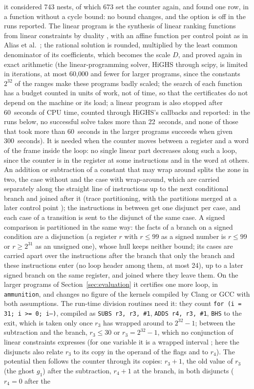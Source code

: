 \documentclass[oneside,english]{amsart}
\numberwithin{equation}{section}
\theoremstyle{plain}
\theoremstyle{definition}
\theoremstyle{plain}
\theoremstyle{plain}
\theoremstyle{remark}
\begin{document}
it considered 743 nests, of which 673 set the counter again, and found one row, in a function without a cycle bound: no bound changes, and the option is off in the runs reported. The linear program is the synthesis of linear ranking functions from linear constraints by duality \cite{colon2001synthesis}, with an affine function per control point as in Alias et al.\ \cite{alias2010multi}; the rational solution is rounded, multiplied by the least common denominator of its coefficients, which becomes the scale $D$, and proved again in exact arithmetic (the linear-programming solver, HiGHS through scipy, is limited in iterations, at most 60{,}000 and fewer for larger programs, since the constants $2^{32}$ of the ranges make these programs badly scaled; the search of each function has a budget counted in units of work, not of time, so that the certificates do not depend on the machine or its load; a linear program is also stopped after 60~seconds of CPU time, counted through HiGHS's callbacks and reported: in the runs below, no successful solve takes more than 22~seconds, and none of those that took more than 60~seconds in the larger programs succeeds when given 300~seconds). It is needed when the counter moves between a register and a word of the frame inside the loop: no single linear part decreases along such a loop, since the counter is in the register at some instructions and in the word at others. An addition or subtraction of a constant that may wrap around splits the zone in two, the case without and the case with wrap-around, which are carried separately along the straight line of instructions up to the next conditional branch and joined after it (trace partitioning, with the partitions merged at a later control point \cite{mauborgne2005trace}); the instructions in between get one disjunct per case, and each case of a transition is sent to the disjunct of the same case. A signed comparison is partitioned in the same way: the facts of a branch on a signed condition are a disjunction (a register $r$ with $r \le 99$ as a signed number is $r \le 99$ or $r \ge 2^{31}$ as an unsigned one), whose hull keeps neither bound; its cases are carried apart over the instructions after the branch that only the branch and these instructions enter (no loop header among them, at most 24), up to a later signed branch on the same register, and joined where they leave them. On the larger programs of Section~\ref{sec:evaluation} it certifies one more loop, in \texttt{ammunition}, and changes no figure of the kernels compiled by Clang or GCC with both assumptions. The run-time division routines need it: they count \texttt{for (i = 31; i >= 0; i--)}, compiled as \texttt{SUBS r3, r3, \#1}, \texttt{ADDS r4, r3, \#1}, \texttt{BHS} to the exit, which is taken only once $r_3$ has wrapped around to $2^{32} - 1$; between the subtraction and the branch, $r_3 \le 30$ or $r_3 = 2^{32} - 1$, which no conjunction of linear constraints expresses (for one variable it is a wrapped interval \cite{gange2015interval}; here the disjuncts also relate $r_3$ to its copy in the operand of the flags and to $r_4$). The potential then follows the counter through its copies: $r_3 + 1$, the old value of $r_3$ (the ghost $g_1$) after the subtraction, $r_4 + 1$ at the branch, in both disjuncts ($r_4 = 0$ after the 
\end{document}
